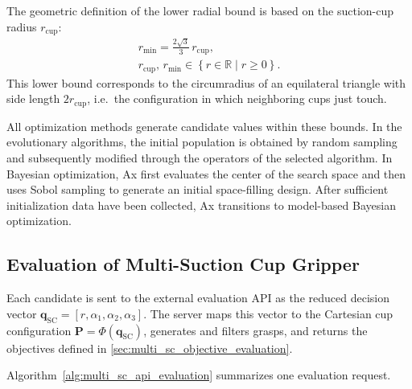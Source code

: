 The geometric definition of the lower radial bound is based on the
suction-cup radius $r_{\mathrm{cup}}$:
\begin{equation}
    \label{eq:r_min}
    \begin{gathered}
        r_{\min}
        =
        \frac{2\sqrt{3}}{3}\,
        r_{\mathrm{cup}},
        \\[4pt]
        r_{\mathrm{cup}},\, r_{\min}
        \in
        \left\{ r \in \mathbb{R} \mid r \ge 0 \right\}.
    \end{gathered}
\end{equation}
This lower bound corresponds to the circumradius of an equilateral
triangle with side length $2r_{\mathrm{cup}}$, i.e.\ the configuration
in which neighboring cups just touch.

All optimization methods generate candidate values within these bounds.
In the evolutionary algorithms, the initial population is obtained by
random sampling and subsequently modified through the operators of the
selected algorithm. In Bayesian optimization, Ax first evaluates the
center of the search space and then uses Sobol sampling to generate an
initial space-filling design. After sufficient initialization data have
been collected, Ax transitions to model-based Bayesian optimization.


\subsection{Evaluation of Multi-Suction Cup Gripper}
\label{sec:multi_sc_api_evaluation}

Each candidate is sent to the external evaluation API as the reduced
decision vector $\mathbf{q}_{\mathrm{SC}}=[r,\alpha_1,\alpha_2,\alpha_3]$. The server maps this vector to the Cartesian cup
configuration $\mathbf{P}=\Phi(\mathbf{q}_{\mathrm{SC}})$, generates and
filters grasps, and returns the objectives defined in \ref{sec:multi_sc_objective_evaluation}.

Algorithm~\ref{alg:multi_sc_api_evaluation} summarizes one evaluation request.

